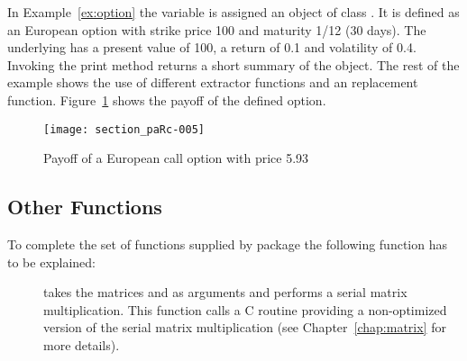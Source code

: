 In Example~\ref{ex:option} the variable  is assigned an
object of class . It is defined as an European option
with strike price 100 and maturity 1/12 (30 days). The underlying has a
present value of 100, a return of 0.1 and volatility of 0.4. Invoking the print
method returns a short summary of the object. The rest
of the example shows the use of different extractor functions and an
replacement function. Figure~\ref{fig:payoff} shows the payoff of the
defined option.

\begin{figure}[t]
\centering
\texttt{[image: section\_paRc-005]}
\label{fig:payoff}
\caption{Payoff of a European call option with price 5.93}
\end{figure}

\subsection{Other Functions}

To complete the set of functions supplied by package  the
following function has to be explained:

\begin{description}
\item[] takes the matrices  and
   as arguments and performs a serial matrix
  multiplication. This function calls a C routine providing a
  non-optimized version of the serial matrix multiplication (see
  Chapter~\ref{chap:matrix} for more details).  
\end{description}
